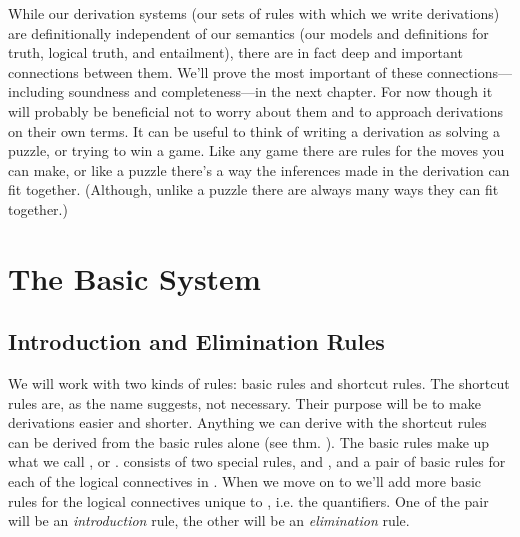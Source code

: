 While our derivation systems (our sets of rules with which we write derivations) are definitionally independent of our semantics (our models and definitions for truth, logical truth, and entailment), there are in fact deep and important connections between them. 
We'll prove the most important of these connections---including soundness and completeness---in the next chapter. 
For now though it will probably be beneficial not to worry about them and to approach derivations on their own terms. 
It can be useful to think of writing a derivation as solving a puzzle, or trying to win a game. 
Like any game there are rules for the moves you can make, or like a puzzle there's a way the inferences made in the derivation can fit together. 
(Although, unlike a puzzle there are always many ways they can fit together.) 

\section{The Basic System \GSD{}}

\subsection{Introduction and Elimination Rules} 
We will work with two kinds of rules: basic rules and shortcut rules. 
The shortcut rules are, as the name suggests, not necessary. 
Their purpose will be to make derivations easier and shorter. 
Anything we can derive with the shortcut rules can be derived from the basic rules alone (see thm. ). 
The basic rules make up what we call , or \GSD{}. 
\GSD{} consists of two special rules,  and , and a pair of basic rules for each of the logical connectives in \GSL{}. 
When we move on to \GQL{} we'll add more basic rules for the logical connectives unique to \GQL{}, i.e. the quantifiers. 
One of the pair will be an \emph{introduction} rule, the other will be an \emph{elimination} rule. 

